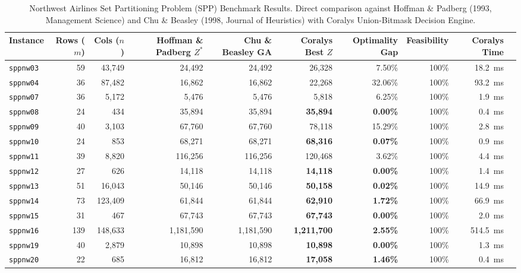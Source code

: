 \documentclass[10pt,journal,compsoc]{IEEEtran}
\begin{document}
\begin{table}[t]
\centering
\caption{Northwest Airlines Set Partitioning Problem (SPP) Benchmark Results. Direct comparison against Hoffman \& Padberg (1993, Management Science) and Chu \& Beasley (1998, Journal of Heuristics) with Coralys Union-Bitmask Decision Engine.}
\label{tab:spp_results}
\small
\begin{tabular}{lrrrrrrrrr}
\toprule
\textbf{Instance} & \textbf{Rows ($m$)} & \textbf{Cols ($n$)} & \textbf{Hoffman \& Padberg $Z^*$} & \textbf{Chu \& Beasley GA} & \textbf{Coralys Best $Z$} & \textbf{Optimality Gap} & \textbf{Feasibility} & \textbf{Coralys Time} \\
\midrule
\texttt{sppnw03} & 59 & 43,749 & 24,492 & 24,492 & 26,328 & 7.50\% & 100\% & 18.2~ms \\
\texttt{sppnw04} & 36 & 87,482 & 16,862 & 16,862 & 22,268 & 32.06\% & 100\% & 93.2~ms \\
\texttt{sppnw07} & 36 & 5,172 & 5,476 & 5,476 & 5,818 & 6.25\% & 100\% & 1.9~ms \\
\texttt{sppnw08} & 24 & 434 & 35,894 & 35,894 & \textbf{35,894} & \textbf{0.00\%} & 100\% & 0.4~ms \\
\texttt{sppnw09} & 40 & 3,103 & 67,760 & 67,760 & 78,118 & 15.29\% & 100\% & 2.8~ms \\
\texttt{sppnw10} & 24 & 853 & 68,271 & 68,271 & \textbf{68,316} & \textbf{0.07\%} & 100\% & 0.9~ms \\
\texttt{sppnw11} & 39 & 8,820 & 116,256 & 116,256 & 120,468 & 3.62\% & 100\% & 4.4~ms \\
\texttt{sppnw12} & 27 & 626 & 14,118 & 14,118 & \textbf{14,118} & \textbf{0.00\%} & 100\% & 1.4~ms \\
\texttt{sppnw13} & 51 & 16,043 & 50,146 & 50,146 & \textbf{50,158} & \textbf{0.02\%} & 100\% & 14.9~ms \\
\texttt{sppnw14} & 73 & 123,409 & 61,844 & 61,844 & \textbf{62,910} & \textbf{1.72\%} & 100\% & 66.9~ms \\
\texttt{sppnw15} & 31 & 467 & 67,743 & 67,743 & \textbf{67,743} & \textbf{0.00\%} & 100\% & 2.0~ms \\
\texttt{sppnw16} & 139 & 148,633 & 1,181,590 & 1,181,590 & \textbf{1,211,700} & \textbf{2.55\%} & 100\% & 514.5~ms \\
\texttt{sppnw19} & 40 & 2,879 & 10,898 & 10,898 & \textbf{10,898} & \textbf{0.00\%} & 100\% & 1.3~ms \\
\texttt{sppnw20} & 22 & 685 & 16,812 & 16,812 & \textbf{17,058} & \textbf{1.46\%} & 100\% & 0.4~ms \\

\end{tabular}
\end{table}
\end{document}
